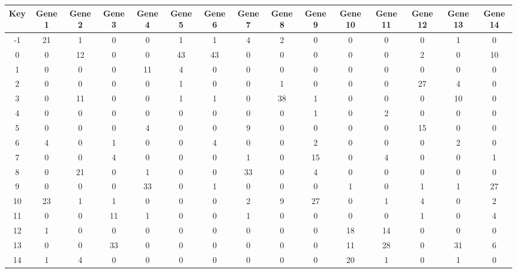 \begin{tabular}{|c|c|c|c|c|c|c|c|c|c|c|c|c|c|c|}
\hline
Key & Gene 1 & Gene 2 & Gene 3 & Gene 4 & Gene 5 & Gene 6 & Gene 7 & Gene 8 & Gene 9 & Gene 10 & Gene 11 & Gene 12 & Gene 13 & Gene 14 \\
\hline
-1 & 21 & 1 & 0 & 0 & 1 & 1 & 4 & 2 & 0 & 0 & 0 & 0 & 1 & 0 \\
0 & 0 & 12 & 0 & 0 & 43 & 43 & 0 & 0 & 0 & 0 & 0 & 2 & 0 & 10 \\
1 & 0 & 0 & 0 & 11 & 4 & 0 & 0 & 0 & 0 & 0 & 0 & 0 & 0 & 0 \\
2 & 0 & 0 & 0 & 0 & 1 & 0 & 0 & 1 & 0 & 0 & 0 & 27 & 4 & 0 \\
3 & 0 & 11 & 0 & 0 & 1 & 1 & 0 & 38 & 1 & 0 & 0 & 0 & 10 & 0 \\
4 & 0 & 0 & 0 & 0 & 0 & 0 & 0 & 0 & 1 & 0 & 2 & 0 & 0 & 0 \\
5 & 0 & 0 & 0 & 4 & 0 & 0 & 9 & 0 & 0 & 0 & 0 & 15 & 0 & 0 \\
6 & 4 & 0 & 1 & 0 & 0 & 4 & 0 & 0 & 2 & 0 & 0 & 0 & 2 & 0 \\
7 & 0 & 0 & 4 & 0 & 0 & 0 & 1 & 0 & 15 & 0 & 4 & 0 & 0 & 1 \\
8 & 0 & 21 & 0 & 1 & 0 & 0 & 33 & 0 & 4 & 0 & 0 & 0 & 0 & 0 \\
9 & 0 & 0 & 0 & 33 & 0 & 1 & 0 & 0 & 0 & 1 & 0 & 1 & 1 & 27 \\
10 & 23 & 1 & 1 & 0 & 0 & 0 & 2 & 9 & 27 & 0 & 1 & 4 & 0 & 2 \\
11 & 0 & 0 & 11 & 1 & 0 & 0 & 1 & 0 & 0 & 0 & 0 & 1 & 0 & 4 \\
12 & 1 & 0 & 0 & 0 & 0 & 0 & 0 & 0 & 0 & 18 & 14 & 0 & 0 & 0 \\
13 & 0 & 0 & 33 & 0 & 0 & 0 & 0 & 0 & 0 & 11 & 28 & 0 & 31 & 6 \\
14 & 1 & 4 & 0 & 0 & 0 & 0 & 0 & 0 & 0 & 20 & 1 & 0 & 1 & 0 \\
\hline
\end{tabular}